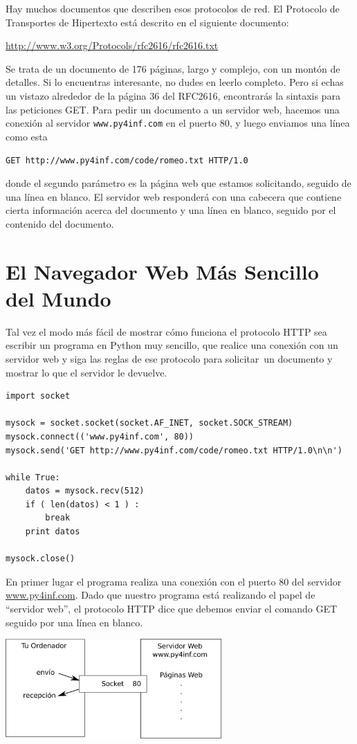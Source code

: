 Hay muchos documentos que describen esos protocolos de red. El Protocolo de Transportes de
Hipertexto está descrito en el siguiente documento:

\url{http://www.w3.org/Protocols/rfc2616/rfc2616.txt}

Se trata de un documento de 176 páginas, largo y complejo, con un montón de detalles. Si lo
encuentras interesante, no dudes en leerlo completo. Pero si echas un vistazo alrededor de la
página 36 del RFC2616, encontrarás la sintaxis para las peticiones GET. Para pedir un documento a un
servidor web, hacemos una conexión al servidor {\tt www.py4inf.com} en el puerto 80, y luego
enviamos una línea como esta

{\tt GET http://www.py4inf.com/code/romeo.txt HTTP/1.0 }

donde el segundo parámetro es la página web que estamos solicitando, seguido
de una línea en blanco. El servidor web responderá con una cabecera que contiene cierta
información acerca del documento y una línea en blanco,
seguido por el contenido del documento.

\section{El Navegador Web Más Sencillo del Mundo}

Tal vez el modo más fácil de mostrar cómo funciona el protocolo HTTP sea escribir un
programa en Python muy sencillo, que realice una conexión con un servidor web y siga
las reglas de ese protocolo para solicitar\ un documento
y mostrar lo que el servidor le devuelve.

\beforeverb
\begin{verbatim}
import socket

mysock = socket.socket(socket.AF_INET, socket.SOCK_STREAM)
mysock.connect(('www.py4inf.com', 80))
mysock.send('GET http://www.py4inf.com/code/romeo.txt HTTP/1.0\n\n')

while True:
    datos = mysock.recv(512)
    if ( len(datos) < 1 ) :
        break
    print datos

mysock.close()
\end{verbatim}
\afterverb
%
En primer lugar el programa realiza una conexión con el puerto 80 del
servidor \url{www.py4inf.com}.
Dado que nuestro programa está realizando el papel de ``servidor web'', el
protocolo HTTP dice que debemos enviar el comando GET seguido por una línea en blanco.

\beforefig
\centerline{\includegraphics[height=1.50in]{figs2/socket.eps}}
\afterfig

